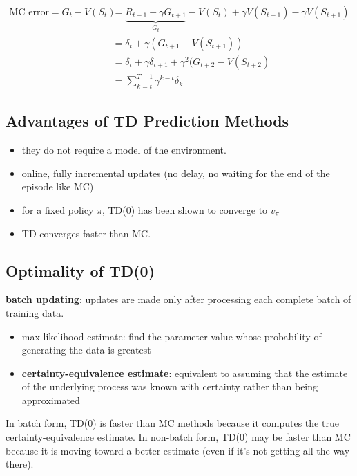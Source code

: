 \documentclass[sutton_barto_notes.tex]{subfiles}
\begin{document}
\begin{align*}
\text{MC error} = G_t - V(S_t) &= \underbrace{R_{t+1}+\gamma G_{t+1}}_{G_t} - V(S_t) + \gamma V(S_{t+1}) - \gamma V(S_{t+1}) \\
&= \delta_t + \gamma (G_{t+1} - V(S_{t+1})) \\
&= \delta_t + \gamma \delta_{t+1} + \gamma^2 (G_{t+2} - V(S_{t+2})\\
&= \sum_{k=t}^{T-1} \gamma^{k-t} \delta_k
\end{align*}

\subsection{Advantages of TD Prediction Methods}

\begin{itemize}
\item they do not require a model of the environment.
\item online, fully incremental updates (no delay, no waiting for the end of the episode like MC)
\item for a fixed policy $\pi$, TD(0) has been shown to converge to $v_\pi$
\item TD converges faster than MC.
\end{itemize}



\subsection{Optimality of TD(0)}

\begin{definition}
\textbf{batch updating}: updates are made only after processing each complete batch of training data.
\end{definition}

\begin{itemize}
\item max-likelihood estimate: find the parameter value whose probability of generating the data is greatest
\item \textbf{certainty-equivalence estimate}: equivalent to assuming that the estimate of the underlying process was known with certainty rather than being approximated
\end{itemize}

In batch form, TD(0) is faster than MC methods because it computes the true certainty-equivalence estimate. In non-batch form, TD(0) may be faster than MC because it is moving toward a better estimate (even if it's not getting all the way there).
\end{document}
